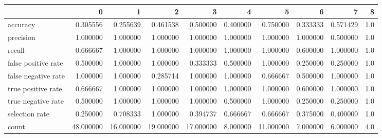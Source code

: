 \begin{tabular}{lrrrrrrrrr}
\toprule
{} &          0 &          1 &          2 &          3 &         4 &          5 &         6 &         7 &    8 \\
\midrule
accuracy            &   0.305556 &   0.255639 &   0.461538 &   0.500000 &  0.400000 &   0.750000 &  0.333333 &  0.571429 &  1.0 \\
precision           &   1.000000 &   1.000000 &   1.000000 &   1.000000 &  1.000000 &   1.000000 &  1.000000 &  0.500000 &  1.0 \\
recall              &   0.666667 &   1.000000 &   1.000000 &   1.000000 &  1.000000 &   1.000000 &  0.600000 &  1.000000 &  1.0 \\
false positive rate &   0.500000 &   1.000000 &   1.000000 &   0.333333 &  0.500000 &   1.000000 &  0.250000 &  0.250000 &  1.0 \\
false negative rate &   1.000000 &   1.000000 &   0.285714 &   1.000000 &  1.000000 &   0.666667 &  0.500000 &  1.000000 &  1.0 \\
true positive rate  &   0.666667 &   1.000000 &   1.000000 &   1.000000 &  1.000000 &   1.000000 &  0.600000 &  1.000000 &  1.0 \\
true negative rate  &   0.500000 &   1.000000 &   1.000000 &   1.000000 &  0.500000 &   1.000000 &  0.250000 &  0.250000 &  1.0 \\
selection rate      &   0.250000 &   0.708333 &   1.000000 &   0.394737 &  0.666667 &   0.666667 &  0.375000 &  0.400000 &  1.0 \\
count               &  48.000000 &  16.000000 &  19.000000 &  17.000000 &  8.000000 &  11.000000 &  7.000000 &  6.000000 &  4.0 \\
\bottomrule
\end{tabular}
